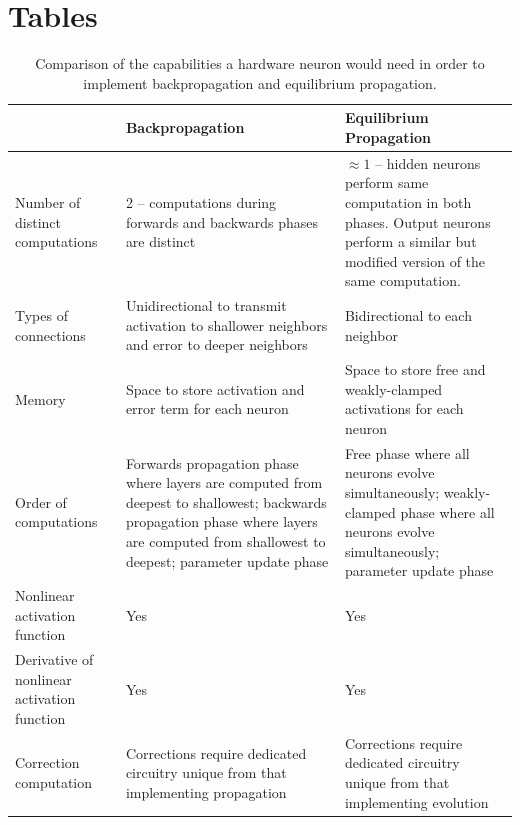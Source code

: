 \documentclass[utf8]{frontiersSCNS}
\begin{document}
\section*{Tables}
\begin{table}[h!]
\begin{center}
\begin{tabular}{|L||L|L|}
\hline
&Backpropagation & Equilibrium Propagation \\ \hline\hline
Number of distinct computations & 2 -- computations during forwards and backwards phases are distinct & $\approx 1$ -- hidden neurons perform same computation in both phases. Output neurons perform a similar but modified version of the same computation. \\ \hline
Types of connections & Unidirectional to transmit activation to shallower neighbors and error to deeper neighbors & Bidirectional to each neighbor \\ \hline
Memory & Space to store activation and error term for each neuron & Space to store free and weakly-clamped activations for each neuron \\ \hline
Order of computations & Forwards propagation phase where layers are computed from deepest to shallowest; backwards propagation phase where layers are computed from shallowest to deepest; parameter update phase & Free phase where all neurons evolve simultaneously; weakly-clamped phase where all neurons evolve simultaneously; parameter update phase \\ \hline
Nonlinear activation function & Yes & Yes \\ \hline
Derivative of nonlinear activation function & Yes & Yes \\ \hline
Correction computation & Corrections require dedicated circuitry unique from that implementing propagation & Corrections require dedicated circuitry unique from that implementing evolution \\ \hline
\end{tabular}
\end{center}
\caption{Comparison of the capabilities a hardware neuron would need in order to implement backpropagation and equilibrium propagation.} \label{table:bp_eqp_contrast}
\end{table}
\end{document}
